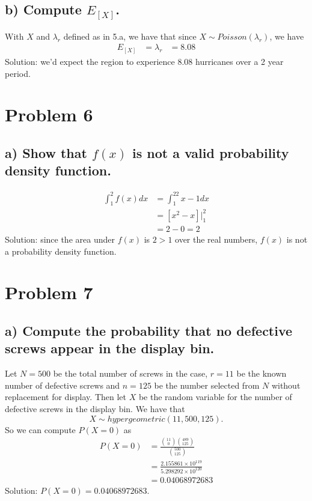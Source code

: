 \documentclass[11pt, letterpaper]{article}
\begin{document}
\subsection*{b) \normalfont Compute $E_{[X]}$.}
With $X$ and $\lambda_r$ defined as in 5.a, we have that since $X\sim Poisson(\lambda_r)$, we have
\begin{align*}
    E_{[X]}&=\lambda_r
    &=8.08
\end{align*}
Solution: we'd expect the region to experience 8.08 hurricanes over a 2 year period. 
\section*{Problem 6}
\subsection*{a) \normalfont Show that $f(x)$ is not a valid probability density function.}
\begin{align*}
    \int_1^2f(x)dx&=\int_1^22x-1dx\\
    &=\left[x^2-x\right]\bigg|_1^2\\
    &=2-0=2
\end{align*}
Solution: since the area under $f(x)$ is $2>1$ over the real numbers, $f(x)$ is not a probability density function.
\section*{Problem 7}
\subsection*{a) \normalfont Compute the probability that no defective screws appear in the display bin.}
Let $N=500$ be the total number of screws in the case, $r=11$ be the known number of defective screws and
$n=125$ be the number selected from $N$ without replacement for display. Then let $X$ be the random variable for
the number of defective screws in the display bin. We have that
\[X\sim hypergeometric(11, 500, 125).\]
So we can compute $P(X=0)$ as 
\begin{align*}
    P(X=0)&=\frac{{11 \choose 0}{489 \choose 125}}{{500 \choose 125}}\\
    &=\frac{2.155861\times 10^{119}}{5.298292\times 10^{120}}\\
    &=0.04068972683
\end{align*}
Solution: $P(X=0)=0.04068972683$.
\end{document}

